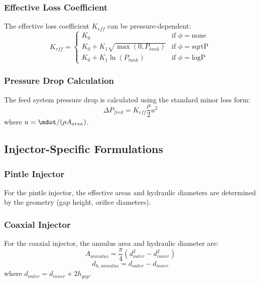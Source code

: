 \subsubsection{Effective Loss Coefficient}
The effective loss coefficient \(K_{eff}\) can be pressure-dependent:
\begin{equation}
K_{eff} = 
\begin{cases} 
K_0 & \text{if } \phi = \text{none} \\
K_0 + K_1 \sqrt{\max(0, P_{tank})} & \text{if } \phi = \text{sqrtP} \\
K_0 + K_1 \ln(P_{tank}) & \text{if } \phi = \text{logP}
\end{cases}
\end{equation}

\subsubsection{Pressure Drop Calculation}
The feed system pressure drop is calculated using the standard minor loss form:
\begin{equation}
\Delta P_{feed} = K_{eff} \frac{\rho}{2} u^2
\end{equation}
where \(u = \mdot / (\rho A_{area})\).

\subsection{Injector-Specific Formulations}

\subsubsection{Pintle Injector}
For the pintle injector, the effective areas and hydraulic diameters are determined by the geometry (gap height, orifice diameters).

\subsubsection{Coaxial Injector}
For the coaxial injector, the annulus area and hydraulic diameter are:
\begin{equation}
A_{annulus} = \frac{\pi}{4} (d_{outer}^2 - d_{inner}^2)
\end{equation}
\begin{equation}
d_{h,annulus} = d_{outer} - d_{inner}
\end{equation}
where \(d_{outer} = d_{inner} + 2 h_{gap}\).

